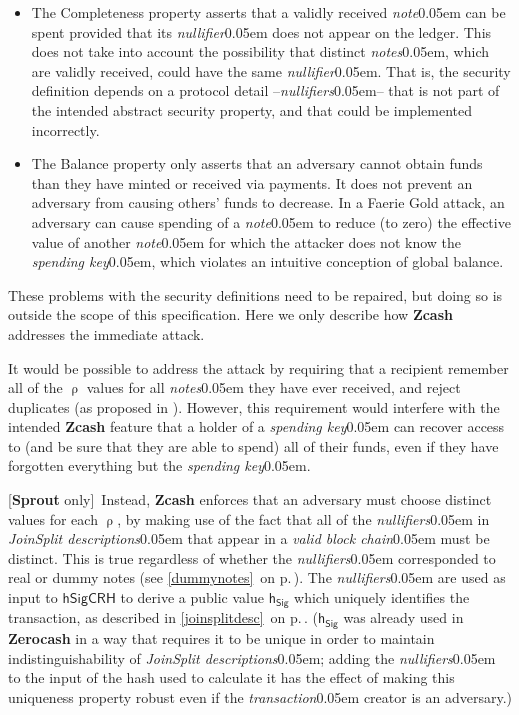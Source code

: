 \documentclass{article}
\renewcommand{\emph}[1]{\hspace{0.15em}{\fontfamily{pnc}\selectfont\scalebox{1.02}[0.999]{\textit{#1}}}\hspace{0.02em}}
\newcommand{\crossref}[1]{\autoref{#1}\, \emph{`\nameref*{#1}\kern -0.05em'} on p.\,\pageref*{#1}}
\newcommand{\notsprout}[1]{#1}
\newcommand{\notsprout}[1]{}
\numberwithin{theorem}{subsection}
\newcommand{\term}[1]{\textsl{#1}\kern 0.05em\xspace}
\newcommand{\termbf}[1]{\textbf{#1}\xspace}
\newcommand{\Zcash}{\termbf{Zcash}}
\newcommand{\Zerocash}{\termbf{Zerocash}}
\newcommand{\Sprout}{\termbf{Sprout}}
\newcommand{\note}{\term{note}}
\newcommand{\notes}{\term{notes}}
\newcommand{\joinSplitDescriptions}{\term{JoinSplit descriptions}}
\newcommand{\transaction}{\term{transaction}}
\newcommand{\validBlockchain}{\term{valid block chain}}
\newcommand{\nullifier}{\term{nullifier}}
\newcommand{\nullifiers}{\term{nullifiers}}
\newcommand{\spendingKey}{\term{spending key}}
\newcommand{\hSigCRH}{\mathsf{hSigCRH}}
\newcommand{\NoteAddressRand}{\mathsf{\uprho}}
\newcommand{\hSig}{\mathsf{h_{Sig}}}
\newcommand{\sproutonly}[1]{\notsprout{[\Sprout only]\,} {#1}}
\begin{document}
\begin{itemize}
  \item The Completeness property asserts that a validly received
\note can be spent provided that its \nullifier does not appear
on the ledger. This does not take into account the possibility
that distinct \notes, which are validly received, could have the
same \nullifier. That is, the security definition depends on
a protocol detail --\nullifiers-- that is not part of the
intended abstract security property, and that could be implemented
incorrectly.
  \item The Balance property only asserts that an adversary cannot
obtain \emph{more} funds than they have minted or received via
payments. It does not prevent an adversary from causing others'
funds to decrease. In a Faerie Gold attack, an adversary can cause
spending of a \note to reduce (to zero) the effective value of another
\note for which the attacker does not know the \spendingKey, which
violates an intuitive conception of global balance.
\end{itemize}

These problems with the security definitions need to be repaired,
but doing so is outside the scope of this specification. Here we
only describe how \Zcash addresses the immediate attack.

It would be possible to address the attack by requiring that a
recipient remember all of the $\NoteAddressRand$ values for all
\notes they have ever received, and reject duplicates (as proposed
in \cite{GGM2016}). However, this requirement would interfere
with the intended \Zcash feature that a holder of a \spendingKey
can recover access to (and be sure that they are able to spend) all
of their funds, even if they have forgotten everything but the
\spendingKey.

\sproutonly{
Instead, \Zcash enforces that an adversary must choose distinct values
for each $\NoteAddressRand$, by making use of the fact that all of the
\nullifiers in \joinSplitDescriptions that appear in a \validBlockchain
must be distinct. This is true regardless of whether the \nullifiers
corresponded to real or dummy notes (see \crossref{dummynotes}).
The \nullifiers are used as input to $\hSigCRH$ to derive a public value
$\hSig$ which uniquely identifies the transaction, as described in
\crossref{joinsplitdesc}. ($\hSig$ was already used in \Zerocash
in a way that requires it to be unique in order to maintain
indistinguishability of \joinSplitDescriptions; adding the \nullifiers
to the input of the hash used to calculate it has the effect of making
this uniqueness property robust even if the \transaction creator is an
adversary.)
}
\end{document}
